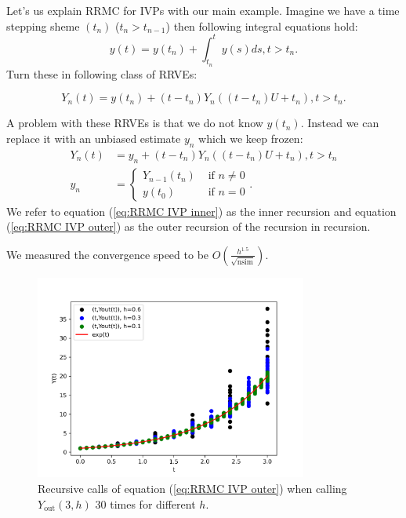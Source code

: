 \documentclass[a4paper,12pt]{article}
\begin{document}
\begin{example}[RRMC $y'=y$] \label{ex:RRMC IVP}
    Let's us explain RRMC for IVPs with our main example.
    Imagine we have a time stepping sheme $(t_{n})$ ($t_{n}> t_{n-1}$)
    then following integral equations hold:
    \begin{equation}
        y(t)= y(t_{n}) + \int_{t_{n}}^{t}y(s)ds , t>t_{n}.
    \end{equation}
    Turn these in following class of RRVEs:

    \begin{equation}
        Y_{n}(t) = y(t_{n}) + (t-t_{n})Y_{n}((t-t_{n})U+t_{n}), t>t_{n}.
    \end{equation}

    A problem with these RRVEs is that we do not know $y(t_{n})$.
    Instead we can replace it with an unbiased estimate $y_{n}$
    which we keep frozen:
    \begin{align}
        \label{eq:RRMC IVP inner}
        Y_{n}(t) & = y_{n} + (t-t_{n})Y_{n}((t-t_{n})U+t_{n}), t>t_{n} \\
        y_{n}    & = \begin{cases}
                         Y_{n-1}(t_{n}) & \text{ if } n \neq 0 \\
                         y(t_{0})       & \text{ if } n = 0
                     \end{cases}.
        \label{eq:RRMC IVP outer}
    \end{align}
    We refer to equation (\ref{eq:RRMC IVP inner}) as the inner recursion and
    equation (\ref{eq:RRMC IVP outer}) as the outer recursion of the recursion in
    recursion.
\end{example}

\begin{pythonn} \label{py:RRMC IVP}
    We measured the convergence speed to be $O\left(\frac{h^{1.5}}{\sqrt{\text{nsim}}}
        \right)$.

    \begin{figure}[h!]
        \centering
        \includegraphics[width=0.8\textwidth]{plots/RRMC IVP.png}
        \caption{Recursive calls of equation (\ref{eq:RRMC IVP outer})
            when calling $Y_{\text{out}}(3,h)$ $30$ times for different $h$.  }
        \label{fig:RRMC IVP}
    \end{figure}
\end{pythonn}
\end{document}
